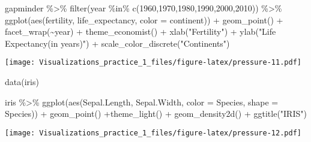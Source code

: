 \documentclass[
]{article}
\newenvironment{Shaded}{\begin{snugshade}}{\end{snugshade}}
\newcommand{\AttributeTok}[1]{\textcolor[rgb]{0.77,0.63,0.00}{#1}}
\newcommand{\DecValTok}[1]{\textcolor[rgb]{0.00,0.00,0.81}{#1}}
\newcommand{\FunctionTok}[1]{\textcolor[rgb]{0.00,0.00,0.00}{#1}}
\newcommand{\NormalTok}[1]{#1}
\newcommand{\SpecialCharTok}[1]{\textcolor[rgb]{0.00,0.00,0.00}{#1}}
\newcommand{\StringTok}[1]{\textcolor[rgb]{0.31,0.60,0.02}{#1}}
\begin{document}
\begin{Shaded}
\begin{Highlighting}[]
\NormalTok{gapminder }\SpecialCharTok{\%\textgreater{}\%} 
  \FunctionTok{filter}\NormalTok{(year }\SpecialCharTok{\%in\%} \FunctionTok{c}\NormalTok{(}\DecValTok{1960}\NormalTok{,}\DecValTok{1970}\NormalTok{,}\DecValTok{1980}\NormalTok{,}\DecValTok{1990}\NormalTok{,}\DecValTok{2000}\NormalTok{,}\DecValTok{2010}\NormalTok{)) }\SpecialCharTok{\%\textgreater{}\%} 
  \FunctionTok{ggplot}\NormalTok{(}\FunctionTok{aes}\NormalTok{(fertility, life\_expectancy, }\AttributeTok{color =}\NormalTok{ continent)) }\SpecialCharTok{+} \FunctionTok{geom\_point}\NormalTok{() }\SpecialCharTok{+} 
  \FunctionTok{facet\_wrap}\NormalTok{(}\SpecialCharTok{\textasciitilde{}}\NormalTok{year) }\SpecialCharTok{+} \FunctionTok{theme\_economist}\NormalTok{() }\SpecialCharTok{+} \FunctionTok{xlab}\NormalTok{(}\StringTok{"Fertility"}\NormalTok{) }\SpecialCharTok{+} 
  \FunctionTok{ylab}\NormalTok{(}\StringTok{"Life Expectancy(in years)"}\NormalTok{) }\SpecialCharTok{+} 
  \FunctionTok{scale\_color\_discrete}\NormalTok{(}\StringTok{"Continents"}\NormalTok{)}
\end{Highlighting}
\end{Shaded}

\texttt{[image: Visualizations\_practice\_1\_files/figure-latex/pressure-11.pdf]}

\begin{Shaded}
\begin{Highlighting}[]
\FunctionTok{data}\NormalTok{(iris)}

\NormalTok{iris }\SpecialCharTok{\%\textgreater{}\%}  
  \FunctionTok{ggplot}\NormalTok{(}\FunctionTok{aes}\NormalTok{(Sepal.Length, Sepal.Width, }\AttributeTok{color =}\NormalTok{ Species, }\AttributeTok{shape =}\NormalTok{ Species)) }\SpecialCharTok{+} 
  \FunctionTok{geom\_point}\NormalTok{() }\SpecialCharTok{+}\FunctionTok{theme\_light}\NormalTok{() }\SpecialCharTok{+} \FunctionTok{geom\_density2d}\NormalTok{() }\SpecialCharTok{+} \FunctionTok{ggtitle}\NormalTok{(}\StringTok{"IRIS"}\NormalTok{)}
\end{Highlighting}
\end{Shaded}

\texttt{[image: Visualizations\_practice\_1\_files/figure-latex/pressure-12.pdf]}
\end{document}
